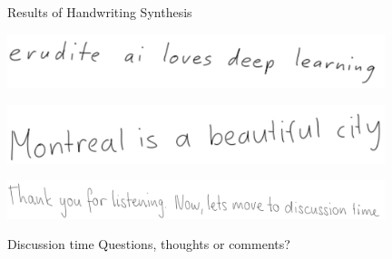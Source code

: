 \documentclass[envcountsect]{beamer}
\begin{document}
\begin{frame}{Results of Handwriting Synthesis}
\begin{center}
\includegraphics[width=11cm]{./imag/dl.png}
\end{center}
\pause
\begin{center}
\includegraphics[width=11cm]{./imag/montreal.png}
\end{center}
\pause
\begin{center}
\includegraphics[width=11cm]{./imag/listening.png}
\end{center}
\end{frame}

\begin{frame}{Discussion time}
    Questions, thoughts or comments?
\end{frame}
\end{document}
